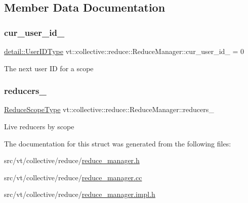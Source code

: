 \subsection{Member Data Documentation}
\mbox{\label{structvt_1_1collective_1_1reduce_1_1_reduce_manager_a716c66493c02898d5ac8c2b8ca62efd0}} 
\subsubsection{\texorpdfstring{cur\+\_\+user\+\_\+id\+\_\+}{cur\_user\_id\_}}
{\footnotesize\ttfamily \hyperlink{namespacevt_1_1collective_1_1reduce_1_1detail_ae82d7b96b0885b9b7dfb0104398beead}{detail\+::\+User\+I\+D\+Type} vt\+::collective\+::reduce\+::\+Reduce\+Manager\+::cur\+\_\+user\+\_\+id\+\_\+ = 0\hspace{0.3cm}{\ttfamily [private]}}

The next user ID for a scope \mbox{\label{structvt_1_1collective_1_1reduce_1_1_reduce_manager_a8226dde1ab69b8332db65f558f405ad5}} 
\subsubsection{\texorpdfstring{reducers\+\_\+}{reducers\_}}
{\footnotesize\ttfamily \hyperlink{structvt_1_1collective_1_1reduce_1_1_reduce_manager_a2c340e5d3b12e4f2df64b9c1502445cf}{Reduce\+Scope\+Type} vt\+::collective\+::reduce\+::\+Reduce\+Manager\+::reducers\+\_\+\hspace{0.3cm}{\ttfamily [private]}}

Live reducers by scope 

The documentation for this struct was generated from the following files\+:\begin{DoxyCompactItemize}
\item 
src/vt/collective/reduce/\hyperlink{reduce__manager_8h}{reduce\+\_\+manager.\+h}\item 
src/vt/collective/reduce/\hyperlink{reduce__manager_8cc}{reduce\+\_\+manager.\+cc}\item 
src/vt/collective/reduce/\hyperlink{reduce__manager_8impl_8h}{reduce\+\_\+manager.\+impl.\+h}\end{DoxyCompactItemize}
